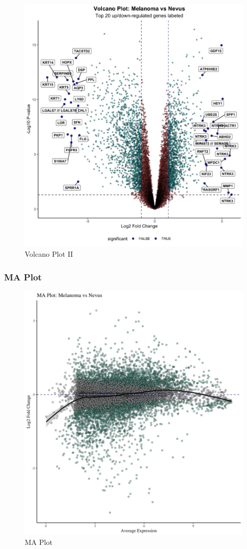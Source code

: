 \documentclass[
]{article}
\begin{document}
\begin{figure}

{\centering \includegraphics[width=0.8\linewidth]{Images/Volcano_Labelled} 

}

\caption{Volcano Plot II}\label{fig:unnamed-chunk-24}
\end{figure}

\newpage

\subsubsection{MA Plot}\label{ma-plot}

\begin{figure}

{\centering \includegraphics[width=0.8\linewidth]{Images/MA_Plot} 

}

\caption{MA Plot}\label{fig:unnamed-chunk-25}
\end{figure}
\end{document}
